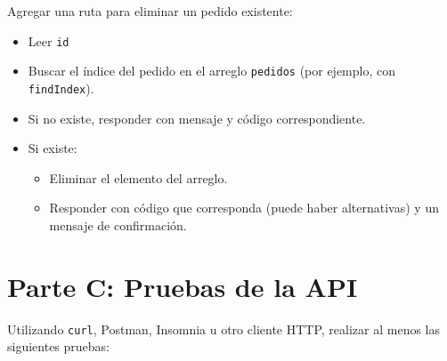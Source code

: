 \documentclass[11pt,a4paper]{article}
\begin{document}
Agregar una ruta para eliminar un pedido existente:

\begin{itemize}
	\item Leer \texttt{id} %
	\item Buscar el índice del pedido en el arreglo \texttt{pedidos} (por ejemplo, con \texttt{findIndex}).
	\item Si no existe, responder con mensaje y código correspondiente. %
	\item Si existe:
	\begin{itemize}
		\item Eliminar el elemento del arreglo.
		\item Responder con código que corresponda (puede haber alternativas) %
		y un mensaje de confirmación.
	\end{itemize}
\end{itemize}

\section{Parte C: Pruebas de la API}

Utilizando \texttt{curl}, Postman, Insomnia u otro cliente HTTP, realizar al menos las siguientes pruebas:
\end{document}
